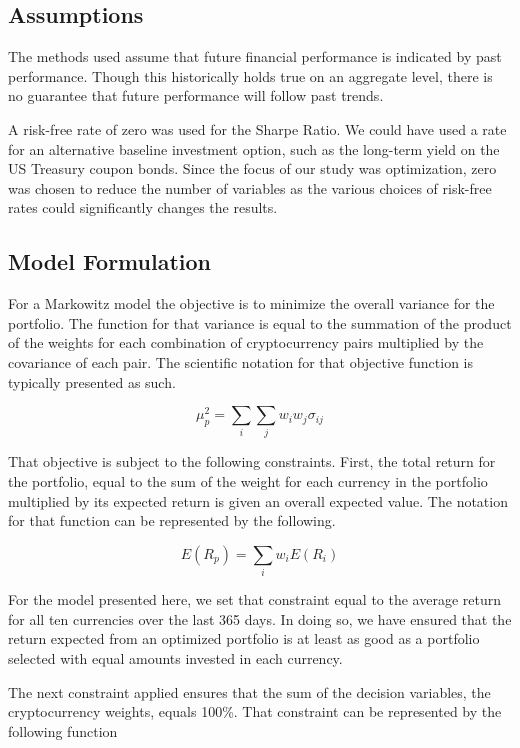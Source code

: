 \documentclass[11pt]{article} %
\begin{document}
\subsection{Assumptions}

The methods used assume that future financial performance is indicated by past performance. Though this historically holds true on an aggregate level, there is no guarantee that future performance will follow past trends. 

A risk-free rate of zero was used for the Sharpe Ratio. We could have used a rate for an alternative baseline investment option, such as the long-term yield on the US Treasury coupon bonds. Since the focus of our study was optimization, zero was chosen to reduce the number of variables as the various choices of risk-free rates could significantly changes the results.

\subsection{Model Formulation}

For a Markowitz model the objective is to minimize the overall variance for the portfolio.  The function for that variance is equal to the summation of the product of the weights for each combination of cryptocurrency pairs multiplied by the covariance of each pair.  The scientific notation for that objective function is typically presented as such. 

\begin{equation} 
\mu_p^2  = \sum_i \sum_j w_i w_j \sigma_{ij}
\end{equation}

That objective is subject to the following constraints.  First, the total return for the portfolio, equal to the sum of the weight for each currency in the portfolio multiplied by its expected return is given an overall expected value.  The notation for that function can be represented by the following.

\begin{equation} 
E(R_p) = \sum_i w_i E(R_i)
\end{equation}
 
For the model presented here, we set that constraint equal to the average return for all ten currencies over the last 365 days. In doing so, we have ensured that the return expected from an optimized portfolio is at least as good as a portfolio selected with equal amounts invested in each currency.
 
The next constraint applied ensures that the sum of the decision variables, the cryptocurrency weights, equals 100\%.  That constraint can be represented by the following function
\end{document}
